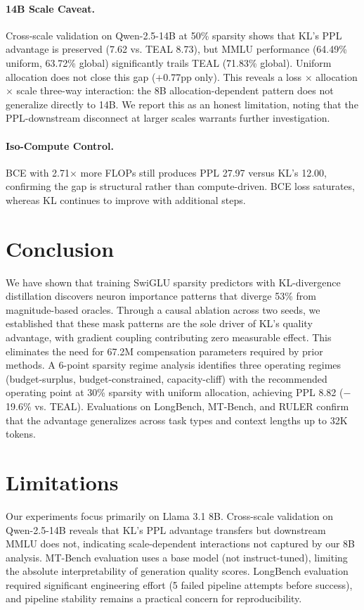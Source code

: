 \documentclass[11pt,a4paper]{article}
\begin{document}
\paragraph{14B Scale Caveat.}
Cross-scale validation on Qwen-2.5-14B at 50\% sparsity shows that KL's PPL advantage is preserved (7.62 vs. TEAL 8.73), but MMLU performance (64.49\% uniform, 63.72\% global) significantly trails TEAL (71.83\% global).
Uniform allocation does not close this gap ($+$0.77pp only).
This reveals a loss $\times$ allocation $\times$ scale three-way interaction: the 8B allocation-dependent pattern does not generalize directly to 14B.
We report this as an honest limitation, noting that the PPL-downstream disconnect at larger scales warrants further investigation.

\paragraph{Iso-Compute Control.}
BCE with 2.71$\times$ more FLOPs still produces PPL 27.97 versus KL's 12.00, confirming the gap is structural rather than compute-driven.
BCE loss saturates, whereas KL continues to improve with additional steps.

\section{Conclusion}

We have shown that training SwiGLU sparsity predictors with KL-divergence distillation discovers neuron importance patterns that diverge 53\% from magnitude-based oracles.
Through a causal ablation across two seeds, we established that these mask patterns are the sole driver of KL's quality advantage, with gradient coupling contributing zero measurable effect.
This eliminates the need for 67.2M compensation parameters required by prior methods.
A 6-point sparsity regime analysis identifies three operating regimes (budget-surplus, budget-constrained, capacity-cliff) with the recommended operating point at 30\% sparsity with uniform allocation, achieving PPL 8.82 ($-$19.6\% vs. TEAL).
Evaluations on LongBench, MT-Bench, and RULER confirm that the advantage generalizes across task types and context lengths up to 32K tokens.

\section*{Limitations}
Our experiments focus primarily on Llama 3.1 8B. Cross-scale validation on Qwen-2.5-14B reveals that KL's PPL advantage transfers but downstream MMLU does not, indicating scale-dependent interactions not captured by our 8B analysis. MT-Bench evaluation uses a base model (not instruct-tuned), limiting the absolute interpretability of generation quality scores. LongBench evaluation required significant engineering effort (5 failed pipeline attempts before success), and pipeline stability remains a practical concern for reproducibility.
\end{document}
